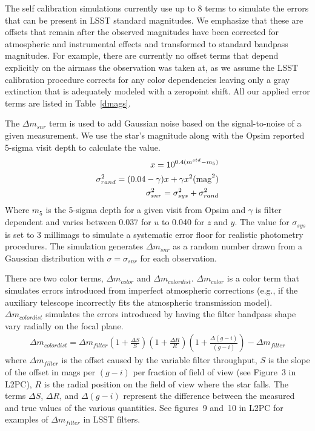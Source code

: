 \documentclass[12pt,preprint]{aastex}
\begin{document}
The self calibration simulations currently use up to 8 terms to simulate the errors that can be present in LSST standard magnitudes.  We emphasize that these are offsets that remain after the observed magnitudes have been corrected for atmospheric and instrumental effects and transformed to standard bandpass magnitudes.  For example, there are currently no offset terms that depend explicitly on the airmass the observation was taken at, as we assume the LSST calibration procedure corrects for any color dependencies leaving only a gray extinction that is adequately modeled with a zeropoint shift.  All our applied error terms are listed in Table~\ref{dmags}.  

The $\Delta m_{snr}$ term is used to add Gaussian noise based on the signal-to-noise of a given measurement.  We use the star's magnitude along with the Opsim reported 5-sigma visit depth to calculate the value. 
\begin{eqnarray}
x = 10^{0.4(m^{std} - m_5)} \\
\sigma^2_{rand} = (0.04-\gamma)x+\gamma x^2 \rm{ (mag}^2) \\
\sigma^2_{snr} = \sigma^2_{sys}+\sigma^2_{rand}
\end{eqnarray}
Where $m_5$ is the 5-sigma depth for a given visit from Opsim and $\gamma$ is filter dependent and varies between 0.037 for $u$ to 0.040 for $z$ and $y$.  The value for $\sigma_{sys}$ is set to 3 millimags to simulate a systematic error floor for realistic photometry procedures.  The simulation generates $\Delta m_{snr}$ as a random number drawn from a Gaussian distribution with $\sigma=\sigma_{snr}$ for each observation.  


There are two color terms, $\Delta m_{color}$ and $\Delta m_{colordist}$.  $\Delta m_{color}$ is a color term that simulates errors introduced from imperfect atmospheric corrections (e.g., if the auxiliary telescope incorrectly fits the atmospheric transmission model).  $\Delta m_{colordist}$ simulates the errors introduced by having the filter bandpass shape vary radially on the focal plane.  
\begin{eqnarray}
\Delta m_{colordist} = \Delta m_{filter} (1+\frac{\Delta S}{S})(1+\frac{\Delta R}{R})(1+\frac{\Delta (g-i)}{(g-i)})-\Delta m_{filter}
\end{eqnarray}
where $\Delta m_{filter}$ is the offset caused by the variable filter throughput, $S$ is the slope of the offset in mags per $(g-i)$ per fraction of field of view (see Figure~3 in L2PC), $R$ is the radial position on the field of view where the star falls.  The terms $\Delta S$, $\Delta R$, and $\Delta (g-i)$ represent the difference between the measured and true values of the various quantities.  See figures~9 and~10 in L2PC for examples of $\Delta m_{filter}$ in LSST filters.
\end{document}
